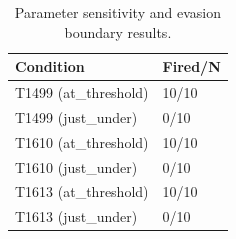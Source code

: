 \begin{table}[t]
\centering
\caption{Parameter sensitivity and evasion boundary results.}
\label{tab:param-sensitivity}
\begin{tabular}{ll}
\toprule
Condition & Fired/N \\
\midrule
T1499 (at_threshold) & 10/10 \\
T1499 (just_under) & 0/10 \\
T1610 (at_threshold) & 10/10 \\
T1610 (just_under) & 0/10 \\
T1613 (at_threshold) & 10/10 \\
T1613 (just_under) & 0/10 \\
\bottomrule
\end{tabular}
\end{table}

